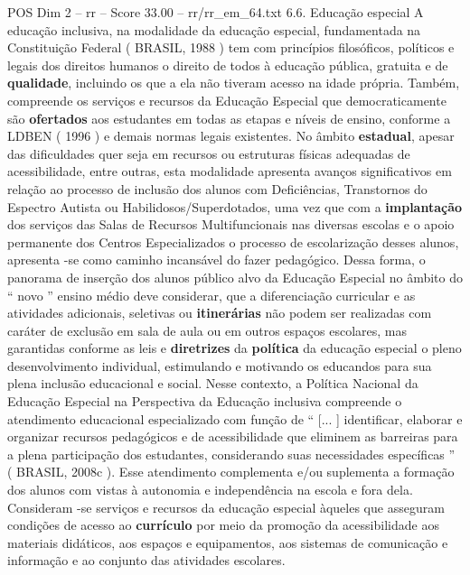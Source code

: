 \begin{textsample}{POS Dim 2 – rr – Score 33.00 – rr/rr\_em\_64.txt}  \label{ex:f2_pos_105}
6.6.
Educação especial A educação inclusiva, na modalidade da educação especial, fundamentada na Constituição Federal ( BRASIL, 1988 ) tem com princípios filosóficos, políticos e legais dos direitos humanos o direito de todos à educação pública, gratuita e de \textbf{qualidade}, incluindo os que a ela não tiveram acesso na idade própria.
Também, compreende os serviços e recursos da Educação Especial que democraticamente são \textbf{ofertados} aos estudantes em todas as etapas e níveis de ensino, conforme a LDBEN ( 1996 ) e demais normas legais existentes.
No âmbito \textbf{estadual}, apesar das dificuldades quer seja em recursos ou estruturas físicas adequadas de acessibilidade, entre outras, esta modalidade apresenta avanços significativos em relação ao processo de inclusão dos alunos com Deficiências, Transtornos do Espectro Autista ou Habilidosos/Superdotados, uma vez que com a \textbf{implantação} dos serviços das Salas de Recursos Multifuncionais nas diversas escolas e o apoio permanente dos Centros Especializados o processo de escolarização desses alunos, apresenta -se como caminho incansável do fazer pedagógico.
Dessa forma, o panorama de inserção dos alunos público alvo da Educação Especial no âmbito do “ novo ” ensino médio deve considerar, que a diferenciação curricular e as atividades adicionais, seletivas ou \textbf{itinerárias} não podem ser realizadas com caráter de exclusão em sala de aula ou em outros espaços escolares, mas garantidas conforme as leis e \textbf{diretrizes} da \textbf{política} da educação especial o pleno desenvolvimento individual, estimulando e motivando os educandos para sua plena inclusão educacional e social.
Nesse contexto, a Política Nacional da Educação Especial na Perspectiva da Educação inclusiva compreende o atendimento educacional especializado com função de “ [... ] identificar, elaborar e organizar recursos pedagógicos e de acessibilidade que eliminem as barreiras para a plena participação dos estudantes, considerando suas necessidades específicas ” ( BRASIL, 2008c ).
Esse atendimento complementa e/ou suplementa a formação dos alunos com vistas à autonomia e independência na escola e fora dela.
Consideram -se serviços e recursos da educação especial àqueles que asseguram condições de acesso ao \textbf{currículo} por meio da promoção da acessibilidade aos materiais didáticos, aos espaços e equipamentos, aos sistemas de comunicação e informação e ao conjunto das atividades escolares.

\end{textsample}
